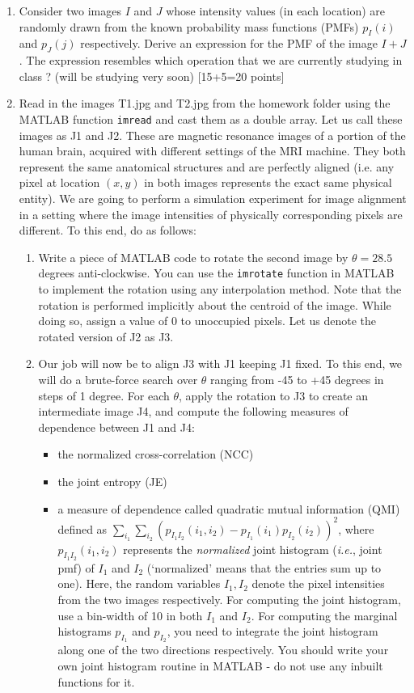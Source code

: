 \documentclass[11pt]{article}
\begin{document}
\begin{enumerate}
\item Consider two images $I$ and $J$ whose intensity values (in each location) are randomly drawn from the known probability mass functions (PMFs) $p_I(i)$ and $p_J(j)$ respectively. Derive an expression for the PMF of the image $I+J$. The expression resembles which operation that we are currently studying in class ? (will be studying very soon) \textsf{[15+5=20 points]}

\item Read in the images T1.jpg and T2.jpg from the homework folder using the MATLAB function \texttt{imread} and cast them as a double array. Let us call these images as J1 and J2. These are magnetic resonance images of a portion of the human brain, acquired with different settings of the MRI machine. They both represent the same anatomical structures and are perfectly aligned (i.e. any pixel at location $(x,y)$ in both images represents the exact same physical entity). We are going to perform a simulation experiment for image alignment in a setting where the image intensities of physically corresponding pixels are different. To this end, do as follows:
\begin{enumerate}
\item Write a piece of MATLAB code to rotate the second image by $\theta = 28.5$ degrees anti-clockwise. You can use the \texttt{imrotate} function in MATLAB to implement the rotation using any interpolation method. Note that the rotation is performed implicitly about the centroid of the image. While doing so, assign a value of 0 to unoccupied pixels. Let us denote the rotated version of J2 as J3. 
\item Our job will now be to align J3 with J1 keeping J1 fixed. To this end, we will do a brute-force search over $\theta$ ranging from -45 to +45 degrees in steps of 1 degree. For each $\theta$, apply the rotation to J3 to create an intermediate image J4, and compute the following measures of dependence between J1 and J4:
\begin{itemize}
\item the normalized cross-correlation (NCC)
\item the joint entropy (JE)
\item a measure of dependence called quadratic mutual information (QMI) defined as $\sum_{i_1}\sum_{i_2} (p_{I_1 I_2}(i_1,i_2)-p_{I_1}(i_1)p_{I_2}(i_2))^2$, where $p_{I_1 I_2}(i_1,i_2)$ represents the \emph{normalized} joint histogram (\textit{i.e.}, joint pmf) of $I_1$ and $I_2$ (`normalized' means that the entries sum up to one). Here, the random variables $I_1, I_2$ denote the pixel intensities from the two images respectively. For computing the joint histogram, use a bin-width of 10 in both $I_1$ and $I_2$. For computing the marginal histograms $p_{I_1}$ and $p_{I_2}$, you need to integrate the joint histogram along one of the two directions respectively. You should write your own joint histogram routine in MATLAB - do not use any inbuilt functions for it. 

\end{itemize}
\end{enumerate}
\end{enumerate}
\end{document}
